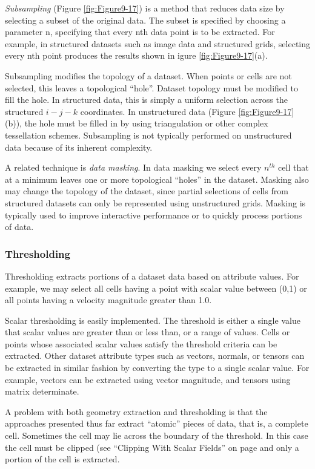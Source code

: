\emph{Subsampling} (Figure \ref{fig:Figure9-17}) is a method that reduces data size by selecting a subset of the original data. The subset is specified by choosing a parameter n, specifying that every nth data point is to be extracted. For example, in structured datasets such as image data and structured grids, selecting every nth point produces the results shown in igure \ref{fig:Figure9-17}(a).

Subsampling modifies the topology of a dataset. When points or cells are not selected, this leaves a topological ``hole''. Dataset topology must be modified to fill the hole. In structured data, this is simply a uniform selection across the structured $i-j-k$ coordinates. In unstructured data (Figure \ref{fig:Figure9-17}(b)), the hole must be filled in by using triangulation or other complex tessellation schemes. Subsampling is not typically performed on unstructured data because of its inherent complexity.

A related technique is \emph{data masking}. In data masking we select every $n^{th}$ cell that at a minimum leaves one or more topological ``holes'' in the dataset. Masking also may change the topology of the dataset, since partial selections of cells from structured datasets can only be represented using unstructured grids. Masking is typically used to improve interactive performance or to quickly process portions of data.

\subsubsection{Thresholding}
\label{subsubsec:thresholding}

Thresholding extracts portions of a dataset data based on attribute values. For example, we may select all cells having a point with scalar value between (0,1) or all points having a velocity magnitude greater than 1.0.

Scalar thresholding is easily implemented. The threshold is either a single value that scalar values are greater than or less than, or a range of values. Cells or points whose associated scalar values satisfy the threshold criteria can be extracted. Other dataset attribute types such as vectors, normals, or tensors can be extracted in similar fashion by converting the type to a single scalar value. For example, vectors can be extracted using vector magnitude, and tensors using matrix determinate.

A problem with both geometry extraction and thresholding is that the approaches presented thus far extract ``atomic'' pieces of data, that is, a complete cell. Sometimes the cell may lie across the boundary of the threshold. In this case the cell must be clipped (see ``Clipping With Scalar Fields'' on page \pageref{subsec:clipping_with_scalar_fields} and only a portion of the cell is extracted.

